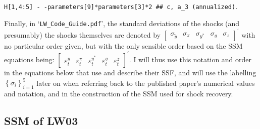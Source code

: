 \documentclass[a4paper,12pt]{article}
\begin{document}
\texttt{H[1,4:5] \TEXTsymbol{<}- -parameters[9]*parameters[3]*2 \#\# c, a\_3
(annualized)}.

\noindent Finally, in `\texttt{LW\_Code\_Guide.pdf}', the standard
deviations of the shocks (and presumably) the shocks themselves are denoted
by $%
\begin{bmatrix}
\sigma _{\tilde{y}} & \sigma _{\pi } & \sigma _{y^{\ast }} & \sigma _{g} & 
\sigma _{z}%
\end{bmatrix}%
^{\prime }$ with no particular order given, but with the only sensible order
based on the SSM equations being: $%
\begin{bmatrix}
\varepsilon _{t}^{y} & \varepsilon _{t}^{\pi } & \varepsilon _{t}^{y^{\ast }}
& \varepsilon _{t}^{g} & \varepsilon _{t}^{z}%
\end{bmatrix}%
^{\prime }$. I will thus use this notation and order in the equations below
that use and describe their SSF, and will use the labelling $\left\{ \sigma
_{i}\right\} _{i=1}^{5}$ later on when referring back to the published
paper's numerical values and notation, and in the construction of the SSM
used for shock recovery.

\pagebreak

\subsection{SSM of LW03}
\end{document}
